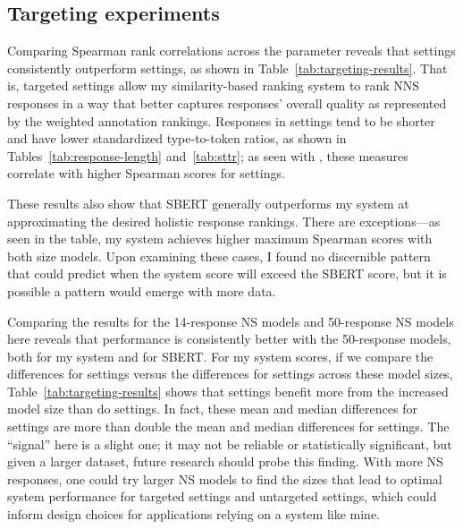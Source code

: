 \subsection{Targeting experiments}
\label{sec:exp-targeting}

Comparing Spearman rank correlations across the  parameter reveals that  settings consistently outperform  settings, as shown in Table~\ref{tab:targeting-results}. That is, targeted settings allow my similarity-based ranking system to rank NNS responses in a way that better captures responses' overall quality as represented by the weighted annotation rankings. Responses in  settings tend to be shorter and have lower standardized type-to-token ratios, as shown in Tables~\ref{tab:response-length} and~\ref{tab:sttr}; as seen with , these measures correlate with higher Spearman scores for  settings.

These results also show that SBERT generally outperforms my system at approximating the desired holistic response rankings. There are exceptions---as seen in the table, my system achieves higher maximum Spearman scores with both size models. Upon examining these cases, I found no discernible pattern that could predict when the system score will exceed the SBERT score, but it is possible a pattern would emerge with more data.

Comparing the results for the 14-response NS models and 50-response NS models here reveals that performance is consistently better with the 50-response models, both for my system and for SBERT. For my system scores, if we compare the differences for  settings versus the differences for  settings across these model sizes, Table~\ref{tab:targeting-results} shows that  settings benefit more from the increased model size than do  settings. In fact, these mean and median differences for  settings are more than double the mean and median differences for  settings. The ``signal'' here is a slight one; it may not be reliable or statistically significant, but given a larger dataset, future research should probe this finding. With more NS responses, one could try larger NS models to find the sizes that lead to optimal system performance for targeted settings and untargeted settings, which could inform design choices for applications relying on a system like mine.


